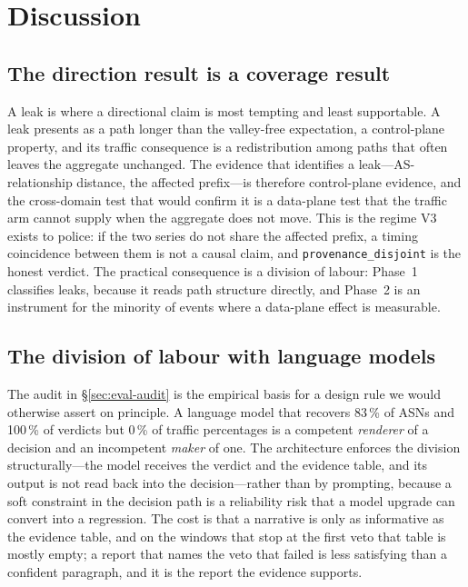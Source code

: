\section{Discussion}
\label{sec:discussion}

\subsection{The direction result is a coverage result}

A leak is where a directional claim is most tempting and least
supportable. A leak presents as a path longer than the valley-free
expectation, a control-plane property, and its traffic consequence is a
redistribution among paths that often leaves the aggregate unchanged. The
evidence that identifies a leak---AS-relationship distance, the affected
prefix---is therefore control-plane evidence, and the cross-domain test
that would confirm it is a data-plane test that the traffic arm cannot
supply when the aggregate does not move. This is the regime V3 exists to
police: if the two series do not share the affected prefix, a timing
coincidence between them is not a causal claim, and
\texttt{provenance\_disjoint} is the honest verdict. The practical
consequence is a division of labour: Phase~1 classifies leaks, because it
reads path structure directly, and Phase~2 is an instrument for the
minority of events where a data-plane effect is measurable.

\subsection{The division of labour with language models}

The audit in \S\ref{sec:eval-audit} is the empirical basis for a design
rule we would otherwise assert on principle. A language model that
recovers 83\,\% of ASNs and 100\,\% of verdicts but 0\,\% of traffic
percentages is a competent \emph{renderer} of a decision and an
incompetent \emph{maker} of one. The architecture enforces the division
structurally---the model receives the verdict and the evidence table, and
its output is not read back into the decision---rather than by prompting,
because a soft constraint in the decision path is a reliability risk that
a model upgrade can convert into a regression. The cost is that a
narrative is only as informative as the evidence table, and on the
windows that stop at the first veto that table is mostly empty; a report
that names the veto that failed is less satisfying than a confident
paragraph, and it is the report the evidence supports.

